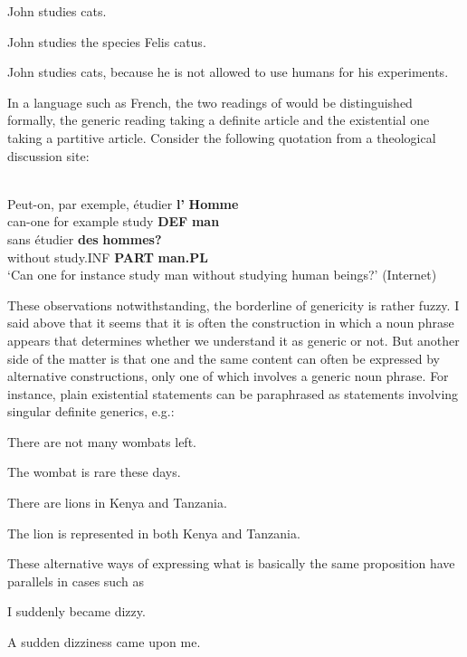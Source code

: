 \ea
\gl \label{bkm:Ref107049066}John studies cats.  
 \z

\ea 
\gl \label{bkm:Ref107049087}John studies the species Felis catus.
\z 

\ea 
\gl \label{bkm:Ref107049114}John studies cats, because he is not allowed to use humans for his experiments. 
\z 

In a language such as French, the two readings of  would be distinguished formally, the generic reading taking a definite article and the existential one taking a partitive article. Consider the following quotation from a theological discussion site:

\ea \label{} 
\\
\gll Peut-on,  par  exemple,  étudier  \textbf{l’} \textbf{ Homme}\\
can-one  for  example  study  \textbf{DEF } \textbf{man}\\
\gll sans  étudier  \textbf{des} \textbf{hommes?} \\
without  study.INF  \textbf{PART} \textbf{man.PL} \\
\glt ‘Can one for instance study man without studying human beings?’ (Internet)

\z

These observations notwithstanding, the borderline of genericity is rather fuzzy. I said above that it seems that it is often the construction in which a noun phrase appears that determines whether we understand it as generic or not. But another side of the matter is that one and the same content can often be expressed by alternative constructions, only one of which involves a generic noun phrase. For instance, plain existential statements can be paraphrased as statements involving singular definite generics, e.g.:

\ea
\gl There are not many wombats left.  
 \z

\ea 
\gl The wombat is rare these days.
\z 

\ea 
\gl There are lions in Kenya and Tanzania.
\z 

\ea
\gl The lion is represented in both Kenya and Tanzania. 
\z 

These alternative ways of expressing what is basically the same proposition have parallels in cases such as

\ea
\gl \label{bkm:Ref107116648}I suddenly became dizzy.  
 \z

\ea 
\gl \label{bkm:Ref107116651}A sudden dizziness came upon me.
\z 

